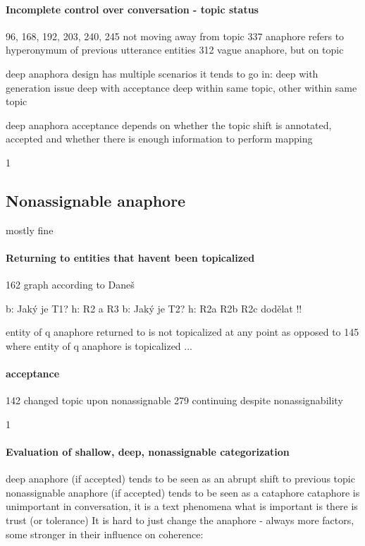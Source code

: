 \paragraph{Incomplete control over conversation - topic status}
    96, 168, 192, 203, 240, 245 not moving away from topic
    337 anaphore refers to hyperonymum of previous utterance entities
    312 vague anaphore, but on topic

    deep anaphora design has multiple scenarios it tends to go in:
    deep with generation issue
    deep with acceptance
    deep within same topic, other within same topic

    deep anaphora acceptance depends on
    whether the topic shift is annotated, accepted and
    whether there is enough information to perform mapping

1
\subsection{Nonassignable anaphore}
mostly fine

\paragraph{Returning to entities that havent been topicalized}
    162 graph according to Daneš

    b: Jaký je T1?
    h: R2 a R3
    b: Jaký je T2?
    h: R2a R2b R2c
    dodělat !!

    entity of q anaphore returned to is not topicalized at any point
    as opposed to 145 where entity of q anaphore is topicalized
    ...

\paragraph{acceptance}
    142 changed topic upon nonassignable
    279 continuing despite nonassignability

1
\paragraph{Evaluation of shallow, deep, nonassignable categorization}
deep anaphore (if accepted) tends to be seen as an abrupt shift to previous topic
nonassignable anaphore (if accepted) tends to be seen as a cataphore
    cataphore is unimportant in conversation, it is a text phenomena
    what is important is there is trust (or tolerance)
		It is hard to just change the anaphore - always more factors, some stronger in their influence on coherence:

